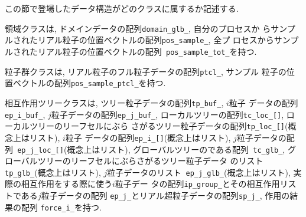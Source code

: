 \documentclass[12pt,a4paper]{jarticle}
\begin{document}
この節で登場したデータ構造がどのクラスに属するか記述する.

領域クラスは, ドメインデータの配列{\tt domain\_glb\_}, 自分のプロセスか
らサンプルされたリアル粒子の位置ベクトルの配列{\tt pos\_sample\_}, 全プ
ロセスからサンプルされたリアル粒子の位置ベクトルの配列{\tt
  pos\_sample\_tot\_}を持つ.

粒子群クラスは, リアル粒子のフル粒子データの配列{\tt ptcl\_}, サンプル
粒子の位置ベクトルの配列{\tt pos\_sample\_ptcl\_}を持つ.

相互作用ツリークラスは, ツリー粒子データの配列{\tt tp\_buf\_}, $i$粒子
データの配列{\tt ep\_i\_buf\_}, $j$粒子データの配列{\tt ep\_j\_buf\_},
ローカルツリーの配列{\tt tc\_loc\_[]}, ローカルツリーのリーフセルにぶら
さがるツリー粒子データの配列{\tt tp\_loc\_[]}(概念上はリスト), $i$粒子
データの配列{\tt ep\_i\_[]}(概念上はリスト), $j$粒子データの配列{\tt
  ep\_j\_loc\_[]}(概念上はリスト), グローバルツリーのである配列{\tt
  tc\_glb\_}, グローバルツリーのリーフセルにぶらさがるツリー粒子データ
のリスト{\tt tp\_glb\_}(概念上はリスト), $j$粒子データのリスト{\tt
  ep\_j\_glb\_}(概念上はリスト), 実際の相互作用をする際に使う$i$粒子デー
タの配列{\tt ip\_group\_}とその相互作用リストである$j$粒子データの配列
{\tt ep\_j\_}とリアル超粒子データの配列{\tt sp\_j\_}, 作用の結果の配列
{\tt force\_i\_}を持つ.
\end{document}
